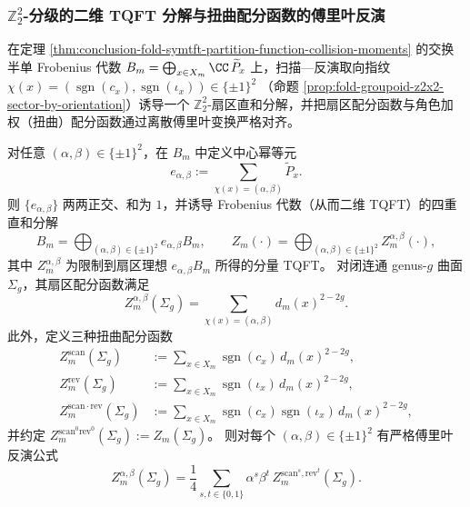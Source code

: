 \subsubsection{\texorpdfstring{$\mathbb Z_2^2$}{Z2^2}-分级的二维 TQFT 分解与扭曲配分函数的傅里叶反演}\label{subsubsec:conclusion-z2x2-sector-tqft-fourier-inversion}
在定理 \ref{thm:conclusion-fold-symtft-partition-function-collision-moments} 的交换半单 Frobenius 代数 \(B_m=\bigoplus_{x\in X_m}\CC\,\widetilde P_x\) 上，扫描—反演取向指纹
\(
\chi(x)=(\operatorname{sgn}(c_x),\operatorname{sgn}(\iota_x))\in\{\pm1\}^2
\)
（命题 \ref{prop:fold-groupoid-z2x2-sector-by-orientation}）诱导一个 \(\mathbb Z_2^2\)-扇区直和分解，并把扇区配分函数与角色加权（扭曲）配分函数通过离散傅里叶变换严格对齐。

\begin{theorem}\label{thm:conclusion-z2x2-sector-tqft-fourier-inversion}
对任意 \((\alpha,\beta)\in\{\pm1\}^2\)，在 \(B_m\) 中定义中心幂等元
\[
e_{\alpha,\beta}:=\sum_{\chi(x)=(\alpha,\beta)}\widetilde P_x.
\]
则 \(\{e_{\alpha,\beta}\}\) 两两正交、和为 \(1\)，并诱导 Frobenius 代数（从而二维 TQFT）的四重直和分解
\[
B_m=\bigoplus_{(\alpha,\beta)\in\{\pm1\}^2}e_{\alpha,\beta}B_m,
\qquad
Z_m(\cdot)=\bigoplus_{(\alpha,\beta)\in\{\pm1\}^2}Z_m^{\alpha,\beta}(\cdot),
\]
其中 \(Z_m^{\alpha,\beta}\) 为限制到扇区理想 \(e_{\alpha,\beta}B_m\) 所得的分量 TQFT。
对闭连通 genus-\(g\) 曲面 \(\Sigma_g\)，其扇区配分函数满足
\[
Z_m^{\alpha,\beta}(\Sigma_g)
=
\sum_{\chi(x)=(\alpha,\beta)}d_m(x)^{2-2g}.
\]
此外，定义三种扭曲配分函数
\[
\begin{aligned}
Z_m^{\mathrm{scan}}(\Sigma_g)
&:=
\sum_{x\in X_m}\operatorname{sgn}(c_x)\,d_m(x)^{2-2g},\\
Z_m^{\mathrm{rev}}(\Sigma_g)
&:=
\sum_{x\in X_m}\operatorname{sgn}(\iota_x)\,d_m(x)^{2-2g},\\
Z_m^{\mathrm{scan\cdot rev}}(\Sigma_g)
&:=
\sum_{x\in X_m}\operatorname{sgn}(c_x)\operatorname{sgn}(\iota_x)\,d_m(x)^{2-2g},
\end{aligned}
\]
并约定 \(Z_m^{\mathrm{scan}^0\mathrm{rev}^0}(\Sigma_g):=Z_m(\Sigma_g)\)。
则对每个 \((\alpha,\beta)\in\{\pm1\}^2\) 有严格傅里叶反演公式
\[
Z_m^{\alpha,\beta}(\Sigma_g)
=
\frac14\sum_{s,t\in\{0,1\}}\alpha^{s}\beta^{t}\,
Z_m^{\mathrm{scan}^{s},\mathrm{rev}^{t}}(\Sigma_g).
\]
\end{theorem}

